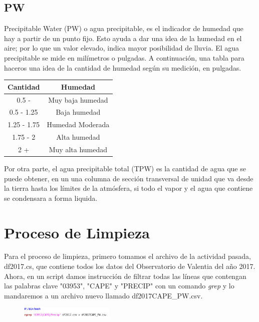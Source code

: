 \documentclass[a4paper]{article}
\begin{document}
\subsection{PW}
Precipitable Water (PW) o agua precipitable, es el indicador de humedad que hay a partir de un punto fijo. Esto ayuda a dar una idea de la humedad en el aire; por lo que un valor elevado, indica mayor posibilidad de lluvia. El agua precipitable se mide en milímetros o pulgadas. A continuación, una tabla para haceros una idea de la cantidad de humedad según su medición, en pulgadas. 
\begin{center}
 \begin{tabular}{||c | c||} 
 \hline
 Cantidad & Humedad  \\ [0.5ex] 
 \hline\hline
 0.5 - & Muy baja humedad \\ 
 \hline
 0.5 - 1.25 & Baja humedad \\
 \hline
 1.25 - 1.75 & Humedad Moderada \\
 \hline
 1.75 - 2 & Alta humedad \\
 \hline
 2 +  & Muy alta humedad \\ [1ex] 
 \hline
\end{tabular}
\end{center}

Por otra parte, el agua precipitable total (TPW) es la cantidad de agua que se puede obtener, en un una columna de sección transversal de unidad que va desde la tierra hasta los límites de la atmósfera, si todo el vapor y el agua que contiene se condensara a forma liquida. 

\section{Proceso de Limpieza}
Para el proceso de limpieza, primero tomamos el archivo de la actividad pasada, df2017.cs, que contiene todos los datos del Observatorio de Valentia del año 2017. Ahora, en un script damos instrucción de filtrar todas las líneas que contengan las palabras clave "03953", "CAPE" y "PRECIP"  con un comando \textit{grep} y lo mandaremos a un archivo nuevo llamado df2017CAPE\_PW.csv. 

\begin{figure}[h!]
 \centering
  \includegraphics[width=0.4\textwidth]{script1.png}
\end{figure}
\end{document}
